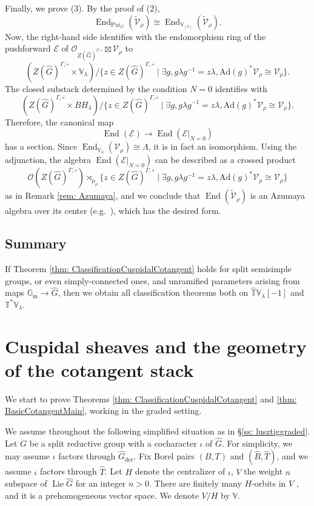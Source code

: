 \documentclass{amsart}
\theoremstyle{definition}
\theoremstyle{remark}
\numberwithin{equation}{section}
\DeclareMathOperator{\Lie}{Lie}
\newcommand{\der}{\mathrm{der}}
\newcommand{\mc}{\mathcal}
\newcommand{\Gm}{{\mathbb{G}_{\mathrm{m}}}}
\DeclareMathOperator{\End}{End}
\newcommand{\wh}{\widehat}
\newcommand{\Par}{\mathrm{Par}}
\newcommand{\V}{\mathbb{V}}
\newcommand{\T}{\mathbb{T}}
\begin{document}
Finally, we prove (3). By the proof of (2), 
\[
\End_{\Par_G} (\widetilde{\mc V}_\rho) \cong \End_{\V_{[\lambda]}} (\widetilde{\mc V}_\rho). 
\]
Now, the right-hand side identifies with the endomorphism ring of the pushforward $\mc E$ of $\mc O_{Z(\wh G)^{\Gamma,\circ}}\boxtimes \mc V_\rho$ to 
\[
(Z(\wh G)^{\Gamma, \circ}\times \V_\lambda )/\{z\in Z(\wh G)^{\Gamma, \circ}\mid \exists g, g\lambda g^{-1}=z\lambda,  \mathrm{Ad}(g)^* \mc V_\rho\cong \mc V_\rho\}. 
\] 
The closed substack determined by the condition $N=0$ identifies with
\[
(Z(\wh G)^{\Gamma, \circ} \times BH_\lambda)/\{z\in Z(\wh G)^{\Gamma, \circ}\mid \exists g, g\lambda g^{-1}=z\lambda,  \mathrm{Ad}(g)^* \mc V_\rho\cong \mc V_\rho\}. 
\] 
Therefore, the canonical map
\[
\End(\mc E) \to \End (\mc E|_{N=0})
\]
has a section. Since $\End_{\V_\lambda}(\mc V_{\rho})\cong \Lambda$, it is in fact an isomorphism. Using the adjunction, the algebra $\End (\mc E|_{N=0})$ can be described as a crossed product
\[
\mc O(Z(\wh G)^{\Gamma,\circ}) \rtimes_{\mu_\rho} \{z\in Z(\wh G)^{\Gamma, \circ}\mid \exists g, g\lambda g^{-1}=z\lambda,  \mathrm{Ad}(g)^* \mc V_\rho\cong \mc V_\rho\}
\]
as in Remark \ref{rem: Azumaya}, and we conclude that $\End(\widetilde{\mc V}_\rho)$ is an Azumaya algebra over its center (e.g.~\cite[Corollary 3.2.7]{AbeOhara}), which has the desired form. 

\subsection{Summary}
If Theorem \ref{thm: ClassificationCuspidalCotangent} holds for split semisimple groups, or even simply-connected ones, and unramified parameters arising from maps $\Gm\to \wh G$, then we obtain all classification theorems both on $\wh{\T}\V_\lambda[-1]$ and $\T^* \V_\lambda$. 

\section{Cuspidal sheaves and the geometry of the cotangent stack}{\label{s: cotangentgeometry}}

We start to prove Theorems \ref{thm: ClassificationCuspidalCotangent} and \ref{thm: BasicCotangentMain}, working in the graded setting. 

We assume throughout the following simplified situation as in \S \ref{ss: lusztiggraded}. Let $G$ be a split reductive group with a cocharacter $\iota$ of $\wh{G}$. For simplicity, we may assume $\iota$ factors through $\wh{G}_{\der}$. Fix Borel pairs $(B, T)$ and $(\wh{B}, \wh{T})$, and we assume $\iota$ factors through $\wh{T}$. Let $H$ denote the centralizer of $\iota$, $V$ the weight $n$ subspace of $\Lie \wh{G}$ for an integer $n > 0$. There are finitely many $H$-orbits in $V$ \cite[Proposition 3.5]{LusztigGraded}, and it is a prehomogeneous vector space. We denote $V/H$ by $\V$.
\end{document}
